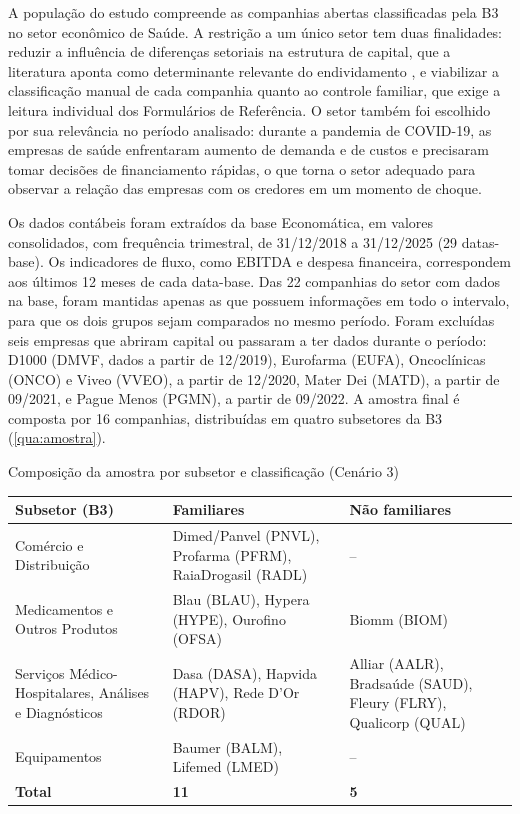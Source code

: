 A população do estudo compreende as companhias abertas classificadas pela B3 no
setor econômico de Saúde. A restrição a um único setor tem duas finalidades:
reduzir a influência de diferenças setoriais na estrutura de capital, que a
literatura aponta como determinante relevante do endividamento
\cite{oliveira2020}, e viabilizar a classificação manual de cada companhia quanto
ao controle familiar, que exige a leitura individual dos Formulários de
Referência. O setor também foi escolhido
por sua relevância no período analisado: durante a pandemia de COVID-19, as empresas
de saúde enfrentaram aumento de demanda e de custos e precisaram tomar decisões de
financiamento rápidas, o que torna o setor adequado para observar a relação das
empresas com os credores em um momento de choque.

Os dados contábeis foram extraídos da base Economática, em valores consolidados,
com frequência trimestral, de 31/12/2018 a 31/12/2025 (29 datas-base). Os
indicadores de fluxo, como EBITDA e despesa financeira, correspondem aos últimos
12 meses de cada data-base. Das 22 companhias do setor com dados na base, foram
mantidas apenas as que possuem informações em todo o intervalo, para que os dois
grupos sejam comparados no mesmo período. Foram excluídas seis empresas que
abriram capital ou passaram a ter dados durante o período: D1000 (DMVF, dados a
partir de 12/2019), Eurofarma (EUFA), Oncoclínicas (ONCO) e Viveo (VVEO), a partir
de 12/2020, Mater Dei (MATD), a partir de 09/2021, e Pague Menos (PGMN), a partir
de 09/2022. A amostra final é composta por 16 companhias, distribuídas em quatro
subsetores da B3 (\autoref{qua:amostra}).

\begin{quadro}[htb]
\caption{Composição da amostra por subsetor e classificação (Cenário 3)}\label{qua:amostra}
\centering\small
\begin{tabularx}{\textwidth}{|P{4.6cm}|L|L|}
\hline
\textbf{Subsetor (B3)} & \textbf{Familiares} & \textbf{Não familiares} \\ \hline
Comércio e Distribuição & Dimed/Panvel (PNVL), Profarma (PFRM), RaiaDrogasil (RADL) & -- \\ \hline
Medicamentos e Outros Produtos & Blau (BLAU), Hypera (HYPE), Ourofino (OFSA) & Biomm (BIOM) \\ \hline
Serviços Médico-Hospitalares, Análises e Diagnósticos & Dasa (DASA), Hapvida (HAPV), Rede D'Or (RDOR) & Alliar (AALR), Bradsaúde (SAUD), Fleury (FLRY), Qualicorp (QUAL) \\ \hline
Equipamentos & Baumer (BALM), Lifemed (LMED) & -- \\ \hline
\textbf{Total} & \textbf{11} & \textbf{5} \\ \hline
\end{tabularx}
\end{quadro}

